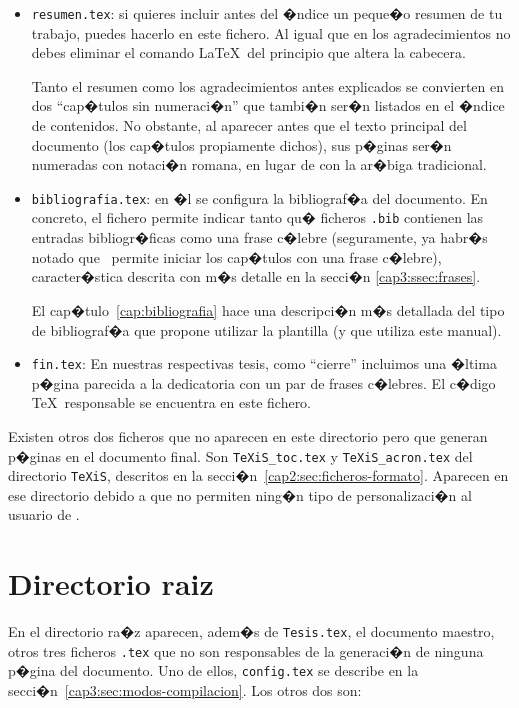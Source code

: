 \begin{itemize}
\item \texttt{resumen.tex}: si quieres incluir antes del �ndice un
  peque�o resumen de tu trabajo, puedes hacerlo en este fichero. Al
  igual que en los agradecimientos no debes eliminar el comando
  \LaTeX\ del principio que altera la cabecera.

  Tanto el resumen como los agradecimientos antes explicados se
  convierten en dos ``cap�tulos sin numeraci�n'' que tambi�n ser�n
  listados en el �ndice de contenidos. No obstante, al aparecer antes
  que el texto principal del documento (los cap�tulos propiamente
  dichos), sus p�ginas ser�n numeradas con notaci�n romana, en
  lugar de con la ar�biga tradicional.

\item \texttt{bibliografia.tex}: en �l se configura la
  bibliograf�a del documento. En concreto, el fichero permite indicar
  tanto qu� ficheros \texttt{.bib} contienen las entradas
  bibliogr�ficas como una frase c�lebre (seguramente, ya habr�s notado
  que \texis\ permite iniciar los cap�tulos con una frase
  c�lebre), caracter�stica descrita con m�s detalle en la secci�n
  \ref{cap3:ssec:frases}.

  El cap�tulo~\ref{cap:bibliografia} hace una descripci�n m�s
  detallada del tipo de bibliograf�a que propone utilizar la plantilla
  (y que utiliza este manual).

\item \texttt{fin.tex}: En nuestras respectivas tesis, como ``cierre''
  incluimos una �ltima p�gina parecida a la dedicatoria con un par de
  frases c�lebres. El c�digo \TeX\ responsable se encuentra en este
  fichero.
\end{itemize}

Existen otros dos ficheros que no aparecen en este directorio pero que
generan p�ginas en el documento final. Son \texttt{TeXiS\_toc.tex} y
\texttt{TeXiS\_acron.tex} del directorio \texttt{TeXiS}, descritos en
la secci�n~\ref{cap2:sec:ficheros-formato}. Aparecen en ese directorio
debido a que no permiten ning�n tipo de personalizaci�n al usuario de
\texis.

\section{Directorio raiz}
\label{cap2:sec:directorio-raiz}

En el directorio ra�z aparecen, adem�s de \texttt{Tesis.tex}, el
documento maestro, otros tres ficheros \texttt{.tex} que no son
responsables de la generaci�n de ninguna p�gina del documento. Uno de
ellos, \texttt{config.tex} se describe en la
secci�n~\ref{cap3:sec:modos-compilacion}. Los otros dos son:

